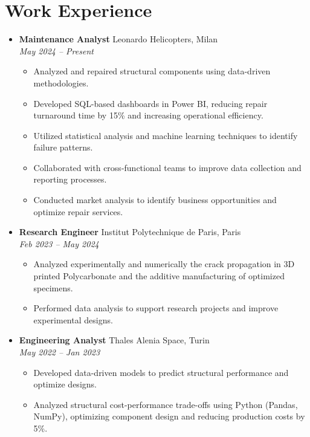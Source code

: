 \documentclass[letterpaper,10.5pt]{article}
\newcommand{\resumeEntry}[4]{
  \item\textbf{#1} \hfill #2\\
  \textit{#3} \hfill \textit{#4}
}
\newcommand{\resumeDescription}[1]{
  \vspace{-3pt}\begin{itemize}[leftmargin=0.2in]
    #1
  \end{itemize}
}
\begin{document}
\section*{Work Experience}
\begin{itemize}[leftmargin=0.2in]
    \resumeEntry{Maintenance Analyst}{Leonardo Helicopters, Milan}{May 2024 -- Present}{}
    \resumeDescription{
        \item Analyzed and repaired structural components using data-driven methodologies.
        \item Developed SQL-based dashboards in Power BI, reducing repair turnaround time by 15\% and increasing operational efficiency.
        \item Utilized statistical analysis and machine learning techniques to identify failure patterns.
        \item Collaborated with cross-functional teams to improve data collection and reporting processes.
        \item Conducted market analysis to identify business opportunities and optimize repair services.
    }
    \resumeEntry{Research Engineer}{Institut Polytechnique de Paris, Paris}{Feb 2023 -- May 2024}{}
    \resumeDescription{
        \item Analyzed experimentally and numerically the crack propagation in 3D printed Polycarbonate and the additive manufacturing of optimized specimens.
        \item Performed data analysis to support research projects and improve experimental designs.
    }
    \resumeEntry{Engineering Analyst}{Thales Alenia Space, Turin}{May 2022 -- Jan 2023}{}
    \resumeDescription{
        \item Developed data-driven models to predict structural performance and optimize designs.
        \item Analyzed structural cost-performance trade-offs using Python (Pandas, NumPy), optimizing component design and reducing production costs by 5\%.
    }
\end{itemize}

\end{document}

